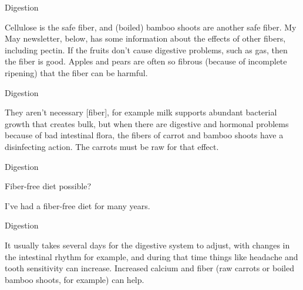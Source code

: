 \documentclass[11pt,oneside,openany,extrafontsizes]{memoir}
\begin{document}
\begin{standalonequote}{Digestion}

    \begin{answer}
        Cellulose is the safe fiber, and (boiled) bamboo shoots are another safe fiber. My May newsletter, below, has some information about the effects of other fibers, including pectin. If the fruits don't cause digestive problems, such as gas, then the fiber is good. Apples and pears are often so fibrous (because of incomplete ripening) that the fiber can be harmful.
    \end{answer}
\end{standalonequote}

\begin{standalonequote}{Digestion}

    \begin{answer}
        They aren't necessary [fiber], for example milk supports abundant bacterial growth that creates bulk, but when there are digestive and hormonal problems because of bad intestinal flora, the fibers of carrot and bamboo shoots have a disinfecting action. The carrots must be raw for that effect.
    \end{answer}
\end{standalonequote}

\begin{qaexchange}{Digestion}

    \begin{question}
        Fiber-free diet possible?
    \end{question}

    \begin{answer}
        I've had a fiber-free diet for many years.
    \end{answer}
\end{qaexchange}

\begin{standalonequote}{Digestion}

    \begin{answer}
        It usually takes several days for the digestive system to adjust, with changes in the intestinal rhythm for example, and during that time things like headache and tooth sensitivity can increase. Increased calcium and fiber (raw carrots or boiled bamboo shoots, for example) can help.
    \end{answer}
\end{standalonequote}
\end{document}
